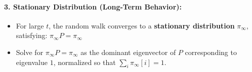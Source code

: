 \paragraph{3. \textbf{Stationary Distribution (Long-Term Behavior)}:}
\begin{itemize}
    \item For large $t$, the random walk converges to a \textbf{stationary distribution} $\pi_\infty$, satisfying: $\pi_\infty P=\pi_\infty$
    \item Solve for  $\pi_{\infty}P=\pi_{\infty}$ as the dominant eigenvector of $P$ corresponding to eigenvalue $1$, normalized so that $\sum\limits_i^{}\pi_{\infty}[i] = 1$.
\end{itemize}

